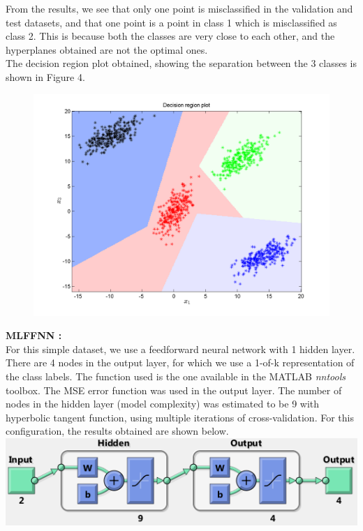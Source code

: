 \documentclass{article}
\begin{document}
\begin{flushleft}
From the results, we see that only one point is misclassified in the validation and test datasets, and that one point is a point in class 1 which is misclassified as class 2. This is because both the classes are very close to each other, and the hyperplanes obtained are not the optimal ones. \\[10pt]

The decision region plot obtained, showing the separation between the 3 classes is shown in Figure 4.


\begin{figure}[H]
\centering
\includegraphics[width=\linewidth]{Classification/linearlySeparable/decn_region_perceptron.png}
\caption{}
\end{figure}
\newpage
\textbf{MLFFNN :} \\[10pt]

For this simple dataset, we use a feedforward neural network with 1 hidden layer. There are 4 nodes in the output layer, for which we use a 1-of-k representation of the class labels. The function used is the one available in the MATLAB \textit{nntools} toolbox. The MSE error function was used in the output layer.
The number of nodes in the hidden layer (model complexity) was estimated to be 9 with hyperbolic tangent function, using multiple iterations of cross-validation. For this configuration, the results obtained are shown below.
\\[5pt]
\includegraphics[scale=0.6]{Classification/linearlySeparable/net_config}
	

\end{flushleft}
\end{document}
